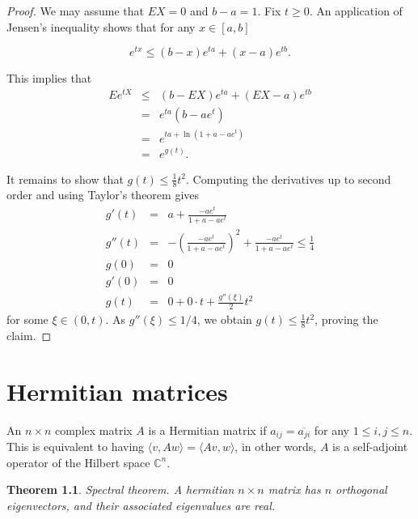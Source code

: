 \documentclass[12pt,a4paper,leqno]{report}
\newcommand{\C}{\mathbb{C}}
\theoremstyle{plain}
\newtheorem{theo}[equation]{Theorem}
\theoremstyle{definition}
\theoremstyle{remark}
\begin{document}
\begin{proof}
We may assume that $EX = 0$ and $b-a = 1$. Fix $t \geq 0$.
An application of Jensen's inequality shows that for any $x \in [a,b]$

\begin{equation*}
e^{tx} \leq (b-x)e^{ta}+(x-a)e^{tb}.
\end{equation*}

This implies that
\begin{eqnarray*}
Ee^{tX} & \leq & (b-EX)e^{ta}+(EX-a)e^{tb}\\
& = & e^{ta}(b-ae^t)\\
& = & e^{ta+\ln(1+a-ae^t)}\\
& = & e^{g(t)}.
\end{eqnarray*}

It remains to show that $g(t) \leq \frac{1}{8}t^2$. Computing the derivatives up to second order and using Taylor's theorem gives
\begin{eqnarray*}
g'(t) & = & a + \frac{-ae^t}{1+a-ae^t}\\
g''(t) & = & -\left( \frac{-ae^t}{1+a-ae^t} \right)^2 + \frac{-ae^t}{1+a-ae^t} \leq \frac{1}{4}\\
g(0) & = &  0\\
g'(0) & = & 0\\
g(t) & = & 0 + 0\cdot t + \frac{g''(\xi)}{2}t^2
\end{eqnarray*}
for some $\xi \in (0,t)$. As $g''(\xi) \leq 1/4$, we obtain $g(t) \leq \frac{1}{8}t^2$, proving the claim.
\end{proof}



\chapter{Hermitian matrices}

An $n \times n$ complex matrix $A$ is a Hermitian matrix if $a_{ij} = \overline{a_{ji}}$ for any $1\leq i,j \leq n$. This is equivalent to having $\langle v, Aw \rangle = \langle Av, w \rangle$, in other words, $A$ is a self-adjoint operator of the Hilbert space $\C^n$.

\begin{theo}
Spectral theorem. A hermitian $n \times n$ matrix has $n$ orthogonal eigenvectors, and their associated eigenvalues are real.
\end{theo}
\end{document}
